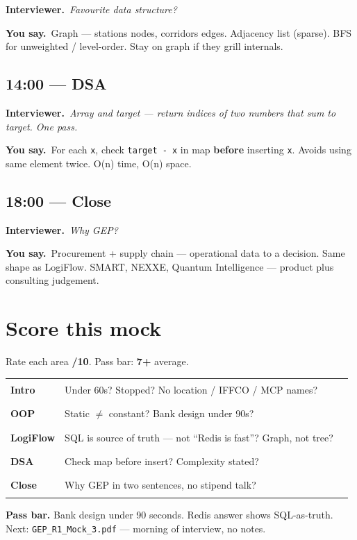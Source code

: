 \documentclass[11pt,a4paper]{article}
\newcommand{\card}[1]{%
  \par\vspace{4pt}%
  \noindent\colorbox{soft}{%
    \parbox{\dimexpr\textwidth-2\fboxsep}{\vspace{5pt}#1\vspace{5pt}}%
  }\par\vspace{5pt}%
}
\newcommand{\IV}[1]{\par\vspace{4pt}\noindent\textcolor{qcol}{\textbf{Interviewer.}}~\textit{#1}\par}
\newcommand{\You}[1]{%
  \par\vspace{2pt}%
  \noindent\colorbox{youbg}{%
    \parbox{\dimexpr\textwidth-2\fboxsep}{\vspace{3pt}\textcolor{you}{\textbf{\small You say.}}~#1\vspace{3pt}}%
  }\par}
\begin{document}
\IV{Favourite data structure?}
\You{Graph --- stations nodes, corridors edges. Adjacency list (sparse). BFS for unweighted / level-order. Stay on graph if they grill internals.}

\subsection*{14:00 --- DSA}
\IV{Array and target --- return indices of two numbers that sum to target. One pass.}
\You{For each \texttt{x}, check \texttt{target - x} in map \textbf{before} inserting \texttt{x}. Avoids using same element twice. O(n) time, O(n) space.}


\subsection*{18:00 --- Close}
\IV{Why GEP?}
\You{Procurement + supply chain --- operational data to a decision. Same shape as LogiFlow. SMART, NEXXE, Quantum Intelligence --- product plus consulting judgement.}

\section{Score this mock}

Rate each area \textbf{/10}. Pass bar: \textbf{7+} average.

\begin{tabular}{@{}p{3cm}p{9.5cm}c@{}}
\textbf{Intro} & Under 60s? Stopped? No location / IFFCO / MCP names? & \rule{1.4cm}{0.4pt} \\
\textbf{OOP} & Static $\neq$ constant? Bank design under 90s? & \rule{1.4cm}{0.4pt} \\
\textbf{LogiFlow} & SQL is source of truth --- not ``Redis is fast''? Graph, not tree? & \rule{1.4cm}{0.4pt} \\
\textbf{DSA} & Check map before insert? Complexity stated? & \rule{1.4cm}{0.4pt} \\
\textbf{Close} & Why GEP in two sentences, no stipend talk? & \rule{1.4cm}{0.4pt} \\
\end{tabular}

\vspace{8pt}
\card{\textbf{Pass bar.} Bank design under 90 seconds. Redis answer shows SQL-as-truth.\\[4pt]
Next: \texttt{GEP\_R1\_Mock\_3.pdf} --- morning of interview, no notes.}
\end{document}
